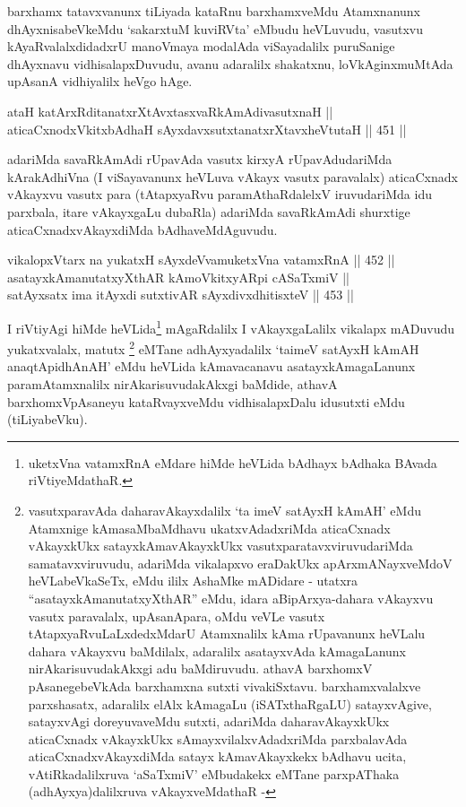 \begin{artha}
barxhamx
tatavxvanunx tiLiyada kataRnu barxhamxveMdu
Atamxnanunx dhAyxnisabeVkeMdu `sakarxtuM kuviRVta' eMbudu heVLuvudu,
vasutxvu kAyaRvalalxdidadxrU manoVmaya modalAda viSayadalilx
puruSanige dhAyxnavu vidhisalapxDuvudu, avanu adaralilx shakatxnu,
loVkAginx\break muMtAda upAsanA vidhiyalilx heVgo hAge.
\end{artha}

\begin{shl}
ataH katArxRditanatxrXtAvxtasxvaRkAmAdivasutxnaH || \\
aticaCxnodxVkitxbAdhaH sAyxdavxsutxtanatxrXtavxheVtutaH \hfill || 451 ||  
\end{shl}

\begin{artha}
adariMda savaRkAmAdi rUpavAda vasutx kirxyA rUpavAdudariMda
kArakAdhiVna (I viSayavanunx heVLuva vAkayx vasutx paravalalx)
aticaCxnadx vAkayxvu vasutx para (tAtapxyaRvu paramAthaRdalelxV
iruvudariMda idu parxbala, itare vAkayxgaLu dubaRla) adariMda
savaRkAmAdi shurxtige aticaCxnadxvAkayxdiMda bAdhaveMdAguvudu.
\end{artha}


\begin{shl}
vikalopxV\s tarx na yukatxH sAyxdeVvamuketxVna vatamxRnA || 452 || \\
asatayxkAmanutatxyXthAR kAmoVkitxyAR\s pi cASaTxmiV || \\
satAyxsatx ima itAyxdi sutxtivAR sAyxdivxdhitisxteV \hfill || 453 ||  
\end{shl}

\begin{artha}
I riVtiyAgi hiMde heVLida\footnote{uketxVna vatamxRnA eMdare hiMde heVLida bAdhayx bAdhaka BAvada riVtiyeMdathaR.} mAgaRdalilx I vAkayxgaLalilx
vikalapx mADuvudu yukatxvalalx, matutx \footnote{vasutxparavAda daharavAkayxdalilx `ta imeV satAyxH kAmAH' eMdu Atamxnige kAmasaMbaMdhavu ukatxvAdadxriMda aticaCxnadx vAkayxkUkx satayxkAmavAkayxkUkx vasutxparatavxviruvudariMda samatavxviruvudu, adariMda vikalapxvo eraDakUkx apArxmANayxveMdoV heVLabeVkaSeTx, eMdu ililx AshaMke mADidare - utatxra ``asatayxkAmanutatxyXthAR'' eMdu, idara aBipArxya-dahara vAkayxvu vasutx paravalalx, upAsanApara, oMdu veVLe vasutx tAtapxyaRvuLaLxdedxMdarU Atamxnalilx kAma rUpavanunx heVLalu dahara vAkayxvu baMdilalx, adaralilx asatayxvAda kAmagaLanunx nirAkarisuvudakAkxgi adu baMdiruvudu. athavA barxhomxV pAsanegebeVkAda barxhamxna sutxti vivakiSxtavu. barxhamxvalalxve parxshasatx, adaralilx elAlx kAmagaLu (iSATxthaRgaLU) satayxvAgive, satayxvAgi doreyuvaveMdu sutxti, adariMda daharavAkayxkUkx aticaCxnadx vAkayxkUkx sAmayxvilalxvAdadxriMda parxbalavAda aticaCxnadxvAkayxdiMda satayx kAmavAkayxkekx bAdhavu ucita, vAtiRkadalilxruva `aSaTxmiV' eMbudakekx eMTane parxpAThaka (adhAyxya)dalilxruva vAkayxveMdathaR -} eMTane adhAyxyadalilx `taimeV satAyxH kAmAH anaqtApidhAnAH' eMdu heVLida kAmavacanavu asatayxkAmagaLanunx paramAtamxnalilx nirAkarisuvudakAkxgi baMdide, athavA barxhomxVpAsaneyu kataRvayxveMdu vidhisalapxDalu idusutxti eMdu (tiLiyabeVku).
\end{artha}


